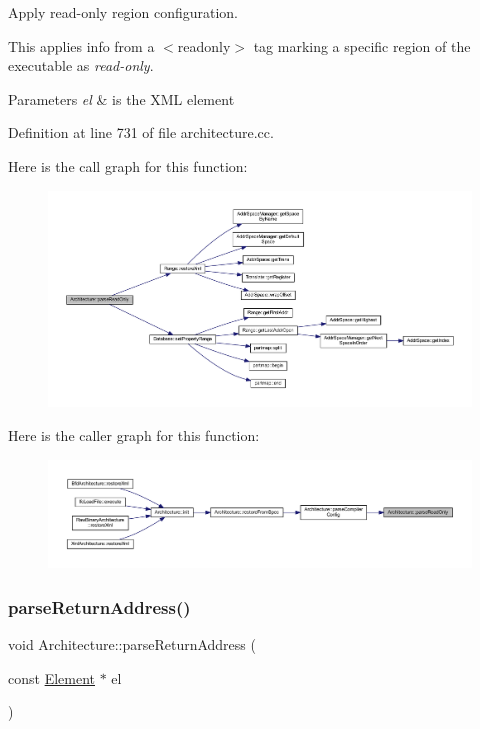 Apply read-\/only region configuration. 

This applies info from a $<$readonly$>$ tag marking a specific region of the executable as {\itshape read-\/only}. 
\begin{DoxyParams}{Parameters}
{\em el} & is the X\+ML element \\
\hline
\end{DoxyParams}


Definition at line 731 of file architecture.\+cc.

Here is the call graph for this function\+:
\nopagebreak
\begin{figure}[H]
\begin{center}
\leavevmode
\includegraphics[width=350pt]{class_architecture_a85374e24548406ae6497021150aa5d2c_cgraph}
\end{center}
\end{figure}
Here is the caller graph for this function\+:
\nopagebreak
\begin{figure}[H]
\begin{center}
\leavevmode
\includegraphics[width=350pt]{class_architecture_a85374e24548406ae6497021150aa5d2c_icgraph}
\end{center}
\end{figure}
\mbox{\label{class_architecture_a24090e497ce6273f83bcb842be816ccb}} 
\subsubsection{\texorpdfstring{parseReturnAddress()}{parseReturnAddress()}}
{\footnotesize\ttfamily void Architecture\+::parse\+Return\+Address (\begin{DoxyParamCaption}\item[{const \mbox{\hyperlink{class_element}{Element}} $\ast$}]{el }\end{DoxyParamCaption})\hspace{0.3cm}{\ttfamily [protected]}}




